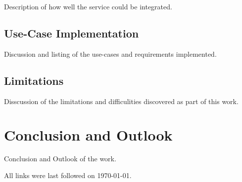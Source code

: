 \documentclass[
a4paper,
twoside,
headsepline,
cleardoublepage=empty,
parskip=half,
draft=false
]{scrbook}
\begin{document}
			Description of how well the service could be integrated.
			
		\section{Use-Case Implementation}\label{sec:use_cases_implementation}
		
			Discussion and listing of the use-cases and requirements implemented.
			
		\section{Limitations}\label{sec:limitations}
		
			Disscussion of the limitations and difficulities discovered as part of this work.
		
	\chapter{Conclusion and Outlook} \label{ch:conclusion_and_outlook}
	
		Conclusion and Outlook of the work.
		
	\clearpage
	
	
	\printbibliography
	
	All links were last followed on \today.
	
	\pagestyle{empty}
	\renewcommand*{\chapterpagestyle}{empty}
	\Versicherung
\end{document}
